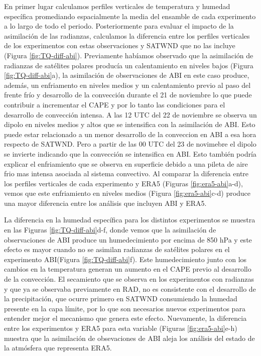 \documentclass[12pt,oneside,a4paper]{reedthesis}
\begin{document}
En primer lugar calculamos perfiles verticales de temperatura y humedad específica promediando espacialmente la media del ensamble de cada experimento a lo largo de todo el periodo. Posteriormente para evaluar el impacto de la asimilación de las radianzas, calculamos la diferencia entre los perfiles verticales de los experimentos con estas observaciones y SATWND que no las incluye (Figura \ref{fig:TQ-diff-abi}). Previamente habíamos observado que la asimilación de radianzas de satélites polares producía un calentamiento en niveles bajos (Figura \ref{fig:TQ-diff-abi}a), la asimilación de observaciones de ABI en este caso produce, además, un enfriamento en niveles medios y un calentamiento previo al paso del frente frío y desarrollo de la convección durante el 21 de noviembre lo que puede contribuir a incrementar el CAPE y por lo tanto las condiciones para el desarrollo de convección intensa. A las 12 UTC del 22 de noviembre se observa un dipolo en niveles medios y altos que se intensifica con la asimilación de ABI. Esto puede estar relacionado a un menor desarrollo de la conveccion en ABI a esa hora respecto de SATWND. Pero a partir de las 00 UTC del 23 de novimebre el dipolo se invierte indicando que la convección se intensifica en ABI. Esto también podría explicar el enfriamiento que se observa en superficie debido a una pileta de aire frio mas intensa asociada al sistema convectivo.
Al comparar la diferencia entre los perfiles verticales de cada experimento y ERA5 (Figuras \ref{fig:era5-abi}a-d), vemos que este enfriamiento en niveles medios (Figura \ref{fig:era5-abi}c-d) produce una mayor diferencia entre los análisis que incluyen ABI y ERA5.

La diferencia en la humedad específica para los distintos experimentos se muestra en las Figuras \ref{fig:TQ-diff-abi}d-f, donde vemos que la asimilación de observaciones de ABI produce un humedecimiento por encima de 850 hPa y este efecto es mayor cuando no se asimilan radianzas de satélites polares en el experimento ABI(Figura \ref{fig:TQ-diff-abi}f). Este humedecimiento junto con los cambios en la temperatura generan un aumento en el CAPE previo al desarrollo de la convección. El secamiento que se observa en los experimentos con radianzas y que ya se observaba previamente en RAD, no es consistente con el desarrollo de la precipitación, que ocurre primero en SATWND consumiendo la humedad presente en la capa límite, por lo que son necesarios nuevos experimentos para entender mejor el mecanismo que genera este efecto. Nuevamente, la diferencia entre los experimentos y ERA5 para esta variable (Figuras \ref{fig:era5-abi}e-h) muestra que la asimilación de obsevaciones de ABI aleja los análisis del estado de la atmósfera que representa ERA5.
\end{document}

